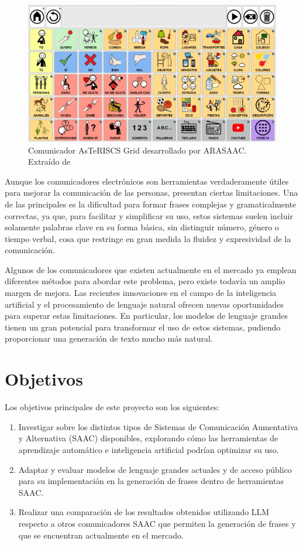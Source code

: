 \documentclass[11pt,spanish,listoffigures,listoftables]{tfgetsinf}
\begin{document}
\begin{figure}[h]
\includegraphics[scale = 0.8]{images/comunicador.jpg}
\centering
\caption{Comunicador AsTeRISCS Grid desarrollado por ARASAAC. Extraído de \cite{asterics_grid_comunicador}}
\label{fig:comunicador}
\end{figure}

Aunque los comunicadores electrónicos son herramientas verdaderamente útiles para mejorar la comunicación de las personas, presentan ciertas limitaciones. Una de las principales es la dificultad para formar frases complejas y gramaticalmente correctas, ya que, para facilitar y simplificar su uso, estos sistemas suelen incluir solamente palabras clave en su forma básica, sin distinguir número, género o tiempo verbal, cosa que restringe en gran medida la fluidez y expresividad de la comunicación.

Algunos de los comunicadores que existen actualmente en el mercado ya emplean diferentes métodos para abordar este problema, pero existe todavía un amplio margen de mejora. Las recientes innovaciones en el campo de la inteligencia artificial y el procesamiento de lenguaje natural ofrecen nuevas oportunidades para superar estas limitaciones. En particular, los modelos de lenguaje grandes tienen un gran potencial para transformar el uso de estos sistemas, pudiendo proporcionar una generación de texto mucho más natural.

\section{Objetivos}

Los objetivos principales de este proyecto son los siguientes:

\begin{enumerate}
	\item Investigar sobre los distintos tipos de Sistemas de Comunicación Aumentativa y Alternativa (SAAC) disponibles, explorando cómo las herramientas de aprendizaje automático e inteligencia artificial podrían optimizar su uso.
	\item Adaptar y evaluar modelos de lenguaje grandes actuales y de acceso público para su implementación  en la generación de frases dentro de herramientas SAAC.
	\item Realizar una comparación de los resultados obtenidos utilizando LLM respecto a otros comunicadores SAAC que permiten la generación de frases y que se encuentran actualmente en el mercado.
\end{enumerate}
\end{document}
